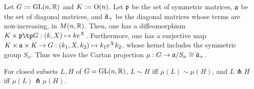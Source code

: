 \documentclass{../../../small}
\begin{document}
\begin{thm*}
Let $G:=\mathrm{GL}(n,\mathbb{R})$ and $K:=\mathrm{O}(n)$.
Let $\mathfrak{p}$ be the set of symmetric matrices, $\mathfrak{a}$ be the set of diagonal matrices, and $\overline{\mathfrak{a}}_+$ be the diagonal matrices whose terms are non-increasing, in $M(n,\mathbb{R})$.
Then, one has a diffeomorphism $K\times\fp\tp G:(k,X)\mapsto ke^X$.
Furthermore, one has a surjective map $K\times\mathfrak{a}\times K\to G:(k_1,X,k_2)\mapsto k_1e^Xk_2$, whose kernel includes the symmetric group $S_n$.
Thus we have the Cartan projection $\mu:G\to\mathfrak{a}/S_n\cong\overline{\mathfrak{a}}_+$.
\end{thm*}

\begin{thm*}
For closed subsets $L,H$ of $G=\mathrm{GL}(n,\mathbb{R})$, $L\sim H$ iff $\mu(L)\sim\mu(H)$, and $L\pitchfork H$ iff $\mu(L)\pitchfork\mu(H)$.
\end{thm*}
\end{document}
